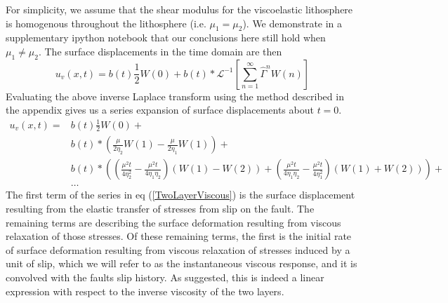 \documentclass[12pt]{article}
\begin{document}
For simplicity, we assume that the shear modulus for the viscoelastic
lithosphere is homogenous throughout the lithosphere (i.e. $\mu_1 =
\mu_2$).  We demonstrate in a supplementary ipython notebook that our
conclusions here still hold when $\mu_1 \neq \mu_2$.  The surface
displacements in the time domain are then 
\begin{equation}
 u_v(x,t) = b(t)\frac{1}{2}W(0) + 
            b(t)\ast\mathcal{L}^{-1}\left[\sum_{n=1}^\infty\hat{\Gamma}^{n}W(n)\right]
\end{equation}
Evaluating the above inverse Laplace transform using the method
described in the appendix gives us a series expansion of surface
displacements about $t=0$.
\begin{align}\label{TwoLayerViscous}
  u_v(x,t) = &b(t)\frac{1}{2}W(0) +\nonumber\\
             &b(t)\ast\left(\frac{\mu}{2\eta_2}W(1) - \frac{\mu}{2\eta_1}W(1)\right) +\nonumber\\
             &b(t)\ast\left(\left(\frac{\mu^2t}{4\eta_2^2} -
                  \frac{\mu^2t}{4\eta_1\eta_2}\right) \left(W(1) - W(2)\right) +
                  \left(\frac{\mu^2t}{4\eta_1\eta_2} - \frac{\mu^2t}{4\eta_1^2}\right)
                  \left(W(1) + W(2)\right)\right) + \nonumber\\ 
             &\dots
\end{align} 
The first term of the series in eq (\ref{TwoLayerViscous}) is the
surface displacement resulting from the elastic transfer of stresses
from slip on the fault.  The remaining terms are describing the
surface deformation resulting from viscous relaxation of those
stresses. Of these remaining terms, the first is the initial rate of
surface deformation resulting from viscous relaxation of stresses
induced by a unit of slip, which we will refer to as the instantaneous
viscous response, and it is convolved with the faults slip history.
As suggested, this is indeed a linear expression with respect to the
inverse viscosity of the two layers.
\end{document}
